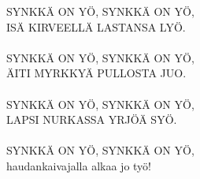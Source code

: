 
            SYNKKÄ ON YÖ, SYNKKÄ ON YÖ, \\
            ISÄ KIRVEELLÄ LASTANSA LYÖ. \\
\hspace{10mm} \\
            SYNKKÄ ON YÖ, SYNKKÄ ON YÖ, \\
            ÄITI MYRKKYÄ PULLOSTA JUO. \\
\hspace{10mm} \\
            SYNKKÄ ON YÖ, SYNKKÄ ON YÖ, \\
            LAPSI NURKASSA YRJÖÄ SYÖ. \\
\hspace{10mm} \\
            SYNKKÄ ON YÖ, SYNKKÄ ON YÖ, \\
            haudankaivajalla alkaa jo työ! \\
